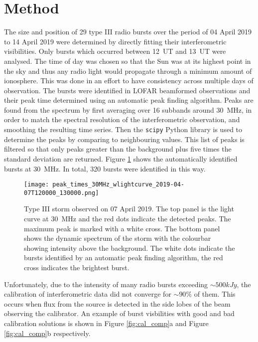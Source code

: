 \section{Method}
\label{sec:obsvtheory_method}
The size and position of 29 type III radio bursts over the period of 04 April 2019 to 14 April 2019 were determined by directly fitting their interferometric visibilities. Only bursts which occurred between 12~UT and 13~UT were analysed. The time of day was chosen so that the Sun was at its highest point in the sky and thus any radio light would propagate through a minimum amount of ionosphere. This was done in an effort to have consistency across multiple days of observation. The bursts were identified in LOFAR beamformed observations and their peak time determined using an automatic peak finding algorithm. Peaks are found from the spectrum by first averaging over 16 subbands around 30~MHz, in order to match the spectral resolution of the interferometric observation, and smoothing the resulting time series. Then the \texttt{scipy} Python library \citep{Virtanen2020} is used to determine the peaks by comparing to neighbouring values. This list of peaks is filtered so that only peaks greater than the background plus five times the standard deviation are returned.
Figure \ref{fig:dynamic_spectrum_070419} shows the automatically identified bursts at 30~MHz. In total, 320 bursts were identified in this way. 

\begin{figure}
\centering
\texttt{[image: peak\_times\_30MHz\_wlightcurve\_2019-04-07T120000\_130000.png]}
\caption[Type III storm observed on 07 April 2019.]{Type III storm observed on 07 April 2019. The top panel is the light curve at 30~MHz and the red dots indicate the detected peaks. The maximum peak is marked with a white cross. The bottom panel shows the dynamic spectrum of the storm with the colourbar showing intensity above the background. The white dots indicate the bursts identified by an automatic peak finding algorithm, the red cross indicates the brightest burst.}
\label{fig:dynamic_spectrum_070419}
\end{figure}

Unfortunately, due to the intensity of many radio bursts exceeding $\sim 500 kJy$, the calibration of interferometric data did not converge for $\sim 90 \%$ of them. This occurs when flux from the source is detected in the side lobes of the beam observing the calibrator. An example of burst visbilities with good and bad calibration solutions is shown in Figure \ref{fig:cal_comp}a and Figure \ref{fig:cal_comp}b respectively. 

